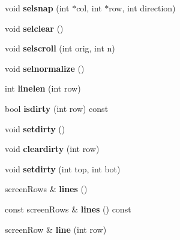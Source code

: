\begin{DoxyCompactItemize}
\item 
\mbox{\label{classScreenImpl_ad75314c7b0bcda98ff126bdf05983824}} 
void {\bfseries selsnap} (int $\ast$col, int $\ast$row, int direction)
\item 
\mbox{\label{classScreenImpl_afd21a68ba2afe54e67b612b25f426c0e}} 
void {\bfseries selclear} ()
\item 
\mbox{\label{classScreenImpl_a9f36219b189be00db878917afddc9ef9}} 
void {\bfseries selscroll} (int orig, int n)
\item 
\mbox{\label{classScreenImpl_af4212b40c9b0a7dec314c52faa9411c0}} 
void {\bfseries selnormalize} ()
\item 
\mbox{\label{classScreenImpl_ad5112e415ef3669c4ea108c0218f7f8d}} 
int {\bfseries linelen} (int row)
\item 
\mbox{\label{classScreenImpl_ab0d3da3f2ec65be04f9e9b9993a7f954}} 
bool {\bfseries isdirty} (int row) const
\item 
\mbox{\label{classScreenImpl_a54537756611f23212fb4b7949276afee}} 
void {\bfseries setdirty} ()
\item 
\mbox{\label{classScreenImpl_a8faef5eb890b5be4fdc39517aa5e9557}} 
void {\bfseries cleardirty} (int row)
\item 
\mbox{\label{classScreenImpl_a5ab07e5a8fb8d4cdaf6b80a540926498}} 
void {\bfseries setdirty} (int top, int bot)
\item 
\mbox{\label{classScreenImpl_a505917a9065e2aa64f9ab75108fcbfbe}} 
screen\+Rows \& {\bfseries lines} ()
\item 
\mbox{\label{classScreenImpl_a2fd73c82938a35ca2748a2e2547fa07e}} 
const screen\+Rows \& {\bfseries lines} () const
\item 
\mbox{\label{classScreenImpl_adefac6af94c8f7498db7714995256e93}} 
screen\+Row \& {\bfseries line} (int row)

\end{DoxyCompactItemize}
